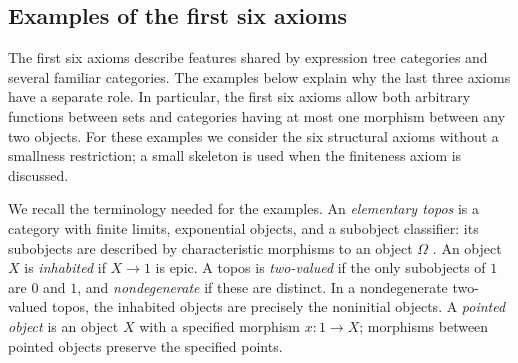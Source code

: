 \documentclass[11pt,a4paper]{article}
\theoremstyle{plain}
\theoremstyle{definition}
\theoremstyle{remark}
\begin{document}
\subsection{Examples of the first six axioms}\label{concl:first-six-examples}

The first six axioms describe features shared by expression tree
categories and several familiar categories. The examples below explain
why the last three axioms have a separate role. In particular, the
first six axioms allow both arbitrary functions between sets and
categories having at most one morphism between any two objects.
For these examples we consider the six structural axioms without a
smallness restriction; a small skeleton is used when the finiteness
axiom is discussed.

We recall the terminology needed for the examples. An
\emph{elementary topos} is a category with finite limits, exponential
objects, and a subobject classifier: its subobjects are described by
characteristic morphisms to an object $\Omega$
\cite{MacLaneMoerdijk}. An object $X$ is \emph{inhabited} if
$X\to1$ is epic. A topos is \emph{two-valued} if the only subobjects
of $1$ are $0$ and $1$, and \emph{nondegenerate} if these are
distinct. In a nondegenerate two-valued topos, the inhabited objects
are precisely the noninitial objects. A \emph{pointed object} is an
object $X$ with a specified morphism $x:1\to X$; morphisms between
pointed objects preserve the specified points.
\end{document}
